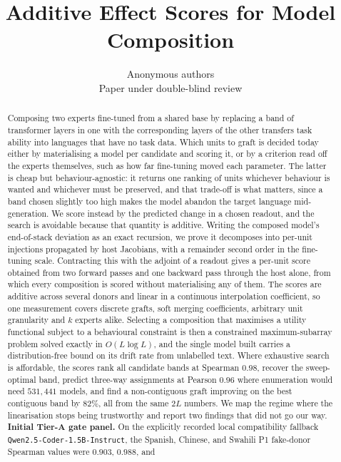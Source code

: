 \documentclass[10pt]{article}
\title{\bf  Additive Effect Scores for Model Composition}
\author{Anonymous authors\\Paper under double-blind review}
\date{}
\theoremstyle{plain}
\theoremstyle{definition}
\theoremstyle{remark}
\begin{document}
\maketitle

\begin{abstract}
Composing two experts fine-tuned from a shared base by replacing a band of
transformer layers in one with the corresponding layers of the other transfers
task ability into languages that have no task data. Which units to graft is decided
today either by materialising a model per candidate and scoring it, or by a
criterion read off the experts themselves, such as how far fine-tuning moved each
parameter. The latter is cheap but behaviour-agnostic: it returns one ranking of
units whichever behaviour is wanted and whichever must be preserved, and that
trade-off is what matters, since a band chosen slightly too high makes the model
abandon the target language mid-generation. We score instead by the predicted
change in a chosen readout, and the search is avoidable because that quantity is
additive. Writing the composed
model's end-of-stack deviation as an exact recursion, we prove it decomposes into
per-unit injections propagated by host Jacobians, with a remainder second order
in the fine-tuning scale. Contracting this with the adjoint of a readout gives a
per-unit score obtained from two forward passes and one backward pass through the
host alone, from which every composition is scored without materialising any of
them. The scores are additive across several donors and linear in a continuous
interpolation coefficient, so one measurement covers discrete grafts, soft
merging coefficients, arbitrary unit granularity and $k$ experts alike.
Selecting a composition that maximises a utility functional subject to a
behavioural constraint is then a constrained maximum-subarray problem solved
exactly in $O(L\log L)$, and the single model built carries a distribution-free
bound on its drift rate from unlabelled text. Where exhaustive search is
affordable, the scores rank all candidate bands at Spearman $0.98$, recover the
sweep-optimal band, predict three-way assignments at Pearson $0.96$ where
enumeration would need $531{,}441$ models, and find a non-contiguous graft
improving on the best contiguous band by $82\%$, all from the same $2L$ numbers.
We map the regime where the linearisation stops being trustworthy and report two
findings that did not go our way.
\textbf{Initial Tier-A gate panel.} On the explicitly recorded local
compatibility fallback \texttt{Qwen2.5-Coder-1.5B-Instruct}, the Spanish,
Chinese, and Swahili P1 fake-donor Spearman values were $0.903$, $0.988$, and

\end{abstract}
\end{document}
